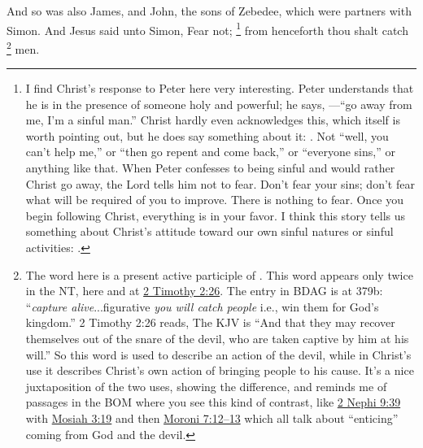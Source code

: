 			And so was also James, and John, the sons of Zebedee, which were partners with Simon. And Jesus said unto Simon, Fear not;%
				\footnote{%
					I find Christ's response to Peter here very interesting. Peter understands that he is in the presence of someone holy and powerful; he says, ---``go away from me, I'm a sinful man.'' Christ hardly even acknowledges this, which itself is worth pointing out, but he does say something about it: . Not ``well, you can't help me,'' or ``then go repent and come back,'' or ``everyone sins,'' or anything like that. When Peter confesses to being sinful and would rather Christ go away, the Lord tells him not to fear. Don't fear your sins; don't fear what will be required of you to improve. There is nothing to fear. Once you begin following Christ, everything is in your favor. I think this story tells us something about Christ's attitude toward our own sinful natures or sinful activities: .
					} 
			from henceforth thou shalt catch%
				\footnote{%
					The word here is a present active participle of . This word appears only twice in the NT, here and at \hyperref[2TIMOTHY-2-26]{2 Timothy 2:26}. The entry in BDAG is at 379b: ``\textit{capture alive}...figurative  \textit{you will catch people} i.e., win them for God's kingdom.'' 2 Timothy 2:26 reads,  The KJV is ``And that they may recover themselves out of the snare of the devil, who are taken captive by him at his will.'' So this word is used to describe an action of the devil, while in Christ's use it describes Christ's own action of bringing people to his cause. It's a nice juxtaposition of the two uses, showing the difference, and reminds me of passages in the BOM where you see this kind of contrast, like \hyperref[2NEPHI-9-39]{2 Nephi 9:39} with \hyperref[MOSIAH-3-19]{Mosiah 3:19} and then \hyperref[MORONI-7-12]{Moroni 7:12--13} which all talk about ``enticing'' coming from God and the devil.
					}
			men. 

